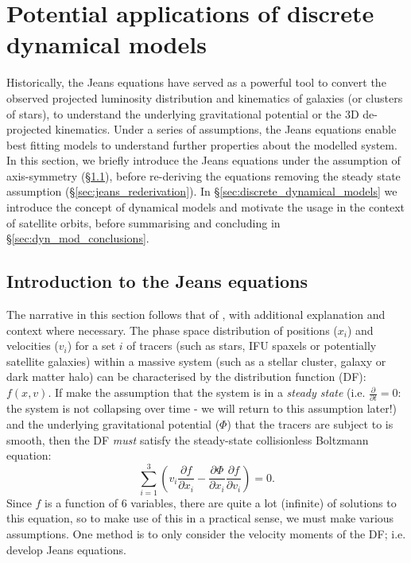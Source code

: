 \section{Potential applications of discrete dynamical models} \label{sec:jam}
Historically, the Jeans equations have served as a powerful tool to convert the observed projected luminosity distribution and kinematics of galaxies (or clusters of stars), to understand the underlying gravitational potential or the 3D de-projected kinematics. Under a series of assumptions, the Jeans equations enable best fitting models to understand further properties about the modelled system. In this section, we briefly introduce the Jeans equations under the assumption of axis-symmetry (\S\ref{sec:jeans_intro}), before re-deriving the equations removing the steady state assumption (\S\ref{sec:jeans_rederivation}). In \S\ref{sec:discrete_dynamical_models} we introduce the concept of dynamical models and motivate the usage in the context of satellite orbits, before summarising and concluding in \S\ref{sec:dyn_mod_conclusions}. 

\subsection{Introduction to the Jeans equations} \label{sec:jeans_intro}
The narrative in this section follows that of \citet{cappellari2008}, with additional explanation and context where necessary. The phase space distribution of positions ($x_{i}$) and velocities ($v_{i}$) for a set $i$ of tracers (such as stars, IFU spaxels or potentially satellite galaxies) within a massive system (such as a stellar cluster, galaxy or dark matter halo) can be characterised by the distribution function (DF): $f(x,v)$. If make the assumption that the system is in a \textit{steady state} (i.e. $\frac{\partial}{\partial t} = 0$: the system is not collapsing over time - we will return to this assumption later!) and the underlying gravitational potential ($\Phi$) that the tracers are subject to is smooth, then the DF \textit{must} satisfy the steady-state collisionless Boltzmann equation:
\begin{equation}
\sum^{3}_{i=1}\left(v_{i}\frac{\partial f}{\partial x_i} - \frac{\partial \Phi}{\partial x_{i}}\frac{\partial f}{\partial v_{i}} \right) = 0.
\end{equation}
Since $f$ is a function of 6 variables, there are quite a lot (infinite) of solutions to this equation, so to make use of this in a practical sense, we must make various assumptions. One method is to only consider the velocity moments of the DF; i.e. develop Jeans equations. 

